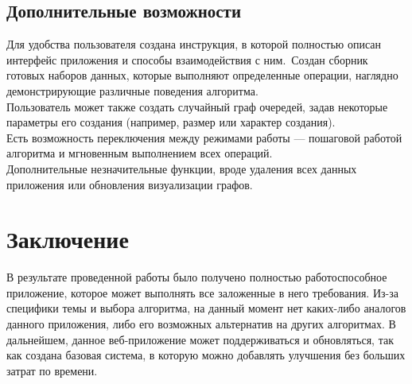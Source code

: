 \documentclass[a4paper,12pt]{extarticle}
\begin{document}
\subsection{Дополнительные возможности}
Для удобства пользователя создана инструкция, в которой полностью описан интерфейс приложения и способы взаимодействия с ним.\
Создан сборник готовых наборов данных, которые выполняют определенные операции, наглядно демонстрирующие различные поведения алгоритма.\\
Пользователь может также создать случайный граф очередей, задав некоторые параметры его создания (например, размер или характер создания).\\
Есть возможность переключения между режимами работы — пошаговой работой алгоритма и мгновенным выполнением всех операций.\\
Дополнительные незначительные функции, вроде удаления всех данных приложения или обновления визуализации графов.

\section{Заключение}
В результате проведенной работы было получено полностью работоспособное приложение, которое может выполнять все заложенные в него требования. Из-за специфики темы и выбора алгоритма, на данный момент нет каких-либо аналогов данного приложения, либо его возможных альтернатив на других алгоритмах. В дальнейшем, данное веб-приложение может поддерживаться и обновляться, так как создана базовая система, в которую можно добавлять улучшения без больших затрат по времени.
\end{document}
